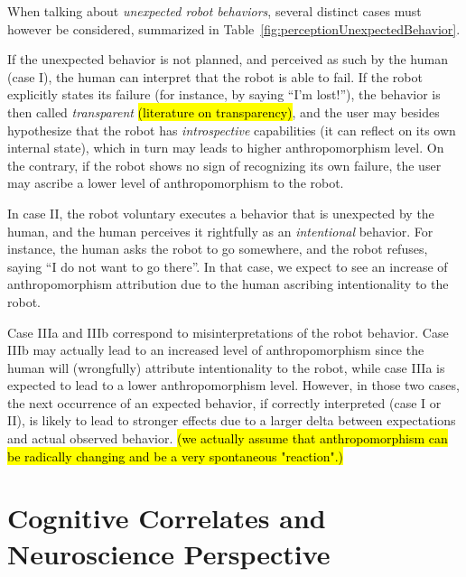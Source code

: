 \documentclass{frontiersSCNS} %
\begin{document}
When talking about \emph{unexpected robot behaviors}, several distinct cases
must however be considered, summarized in
Table~\ref{fig:perceptionUnexpectedBehavior}.

If the unexpected behavior is not planned, and perceived as such by the human
(case I), the human can interpret that the robot is able to fail. If the robot
explicitly states its failure (for instance, by saying ``I'm lost!''), the
behavior is then called \emph{transparent} 
\hl{(literature on transparency)}, and the user may besides hypothesize that the
robot has \emph{introspective} capabilities (it can reflect on its own internal
state), which in turn may leads to higher anthropomorphism level.  On the
contrary, if the robot shows no sign of recognizing its own failure, the user
may ascribe a lower level of anthropomorphism to the robot.

In case II, the robot voluntary executes a behavior that is unexpected by the
human, and the human perceives it rightfully as an \emph{intentional} behavior.
For instance, the human asks the robot to go somewhere, and the robot refuses,
saying ``I do not want to go there''. In that case, we expect to see an increase
of anthropomorphism attribution due to the human ascribing intentionality to the
robot.

Case IIIa and IIIb correspond to misinterpretations of the robot behavior. Case
IIIb may actually lead to an increased level of anthropomorphism since the human
will (wrongfully) attribute intentionality to the robot, while case IIIa is
expected to lead to a lower anthropomorphism level.  However, in those two
cases, the next occurrence of an expected behavior, if correctly interpreted
(case I or II), is likely to lead to stronger effects due to a larger delta
between expectations and actual observed behavior. \hl{(we actually assume that
anthropomorphism can be radically changing and be a very spontaneous
"reaction".)}




%
%
%
%
%
%
%
%
%

\section{Cognitive Correlates and Neuroscience Perspective}
\label{sec:cognition-neuroscience}
\end{document}
